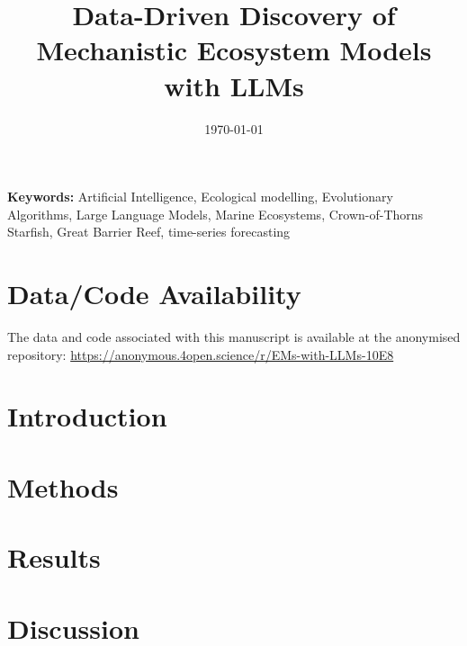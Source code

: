 \documentclass[12pt,a4paper]{article}
\title{Data-Driven Discovery of Mechanistic Ecosystem Models with LLMs}
\date{\today}
\newcommand{\keywords}{%
Artificial Intelligence,
Ecological modelling,
Evolutionary Algorithms,
Large Language Models,
Marine Ecosystems,
Crown-of-Thorns Starfish,
Great Barrier Reef,
time-series forecasting%
}
\begin{document}
\maketitle
\vspace{1em}

\noindent\textbf{Keywords:} \keywords
\vspace{2em}
\newpage


\section*{Data/Code Availability}
The data and code associated with this manuscript is available at the anonymised repository: \url{https://anonymous.4open.science/r/EMs-with-LLMs-10E8}

\newpage
\section{Introduction}

\section{Methods}

\section{Results}

\section{Discussion}





% 
\end{document}
